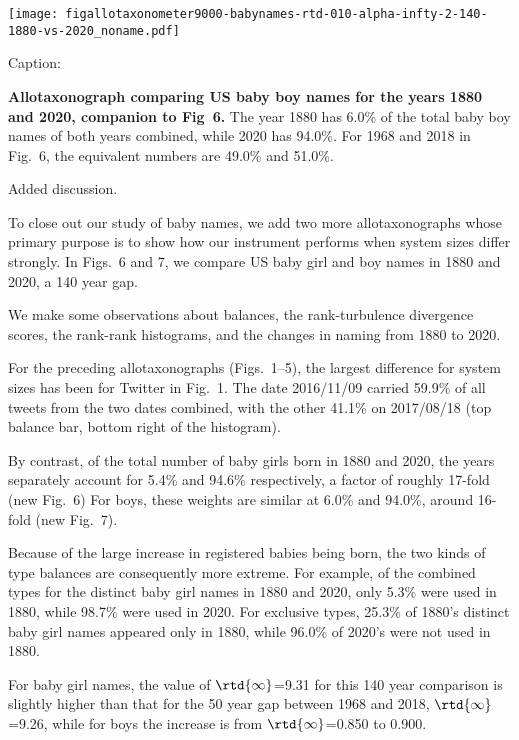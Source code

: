 \texttt{[image: figallotaxonometer9000-babynames-rtd-010-alpha-infty-2-140-1880-vs-2020\_noname.pdf]}

Caption:

\begin{excerpt}
  \textbf{Allotaxonograph comparing US baby boy names for the years 1880 and 2020,
    companion to Fig~6.}
  The year 1880 has 6.0\% of the total baby boy names of both years combined,
  while 2020 has 94.0\%.
  For 1968 and 2018 in Fig.~6,
  the equivalent numbers are 49.0\% and 51.0\%.
\end{excerpt}

Added discussion.

\begin{excerpt}
  To close out our study of baby names, we add two more allotaxonographs
  whose primary purpose is to show how our instrument performs when system sizes differ strongly.
  In Figs.~6 and 7,
  we compare US baby girl and boy names in 1880 and 2020, a 140 year gap.

  We make some observations about balances,
  the rank-turbulence divergence scores,
  the rank-rank histograms,
  and
  the changes in naming from 1880 to 2020.

  For the preceding allotaxonographs
  (Figs.~1--5),
  the largest difference for system sizes has been for
  Twitter in Fig.~1.
  The date 2016/11/09 carried 59.9\% of all tweets from the two dates combined,
  with the other 41.1\% on 2017/08/18
  (top balance bar, bottom right of the histogram).

  By contrast, of the total number of baby girls born in 1880 and 2020,
  the years separately account for 5.4\% and 94.6\% respectively,
  a factor of roughly 17-fold
  (new Fig.~6)
  For boys, these weights are similar at 6.0\% and 94.0\%, around 16-fold
  (new Fig.~7).

  Because of the large increase in registered babies being born,
  the two kinds of type balances are consequently more extreme.
  For example, of the combined types for the distinct baby girl names in 1880 and 2020,
  only 5.3\% were used in 1880, while 98.7\% were used in 2020.
  For exclusive types, 25.3\% of 1880's distinct baby girl names appeared
  only in 1880, while 96.0\% of 2020's were not used in 1880.

  For baby girl names, the value of $\rtd{\infty}$=9.31 for this 140 year comparison is slightly higher
  than that for the 50 year gap between 1968 and 2018, $\rtd{\infty}$=9.26,
  while for boys the increase is from $\rtd{\infty}$=0.850 to 0.900.


\end{excerpt}
